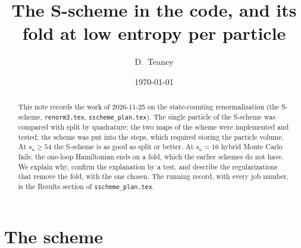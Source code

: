 \documentclass[11pt,aps,preprint,nofootinbib,superscriptaddress,tightenlines]{revtex4-2}
\begin{document}
\sloppy

\title{The S-scheme in the code, and its fold at low entropy per particle}
\author{D.~Teaney}
\date{\today}

\begin{abstract}
This note records the work of 2026-11-25 on the state-counting renormalization (the S-scheme, \nolinkurl{renorm3.tex}, \nolinkurl{sscheme_plan.tex}).
The single particle of the S-scheme was compared with split by quadrature; the two maps of the scheme were implemented and tested; the scheme was
put into the steps, which required storing the particle volume.  At $s_a\ge54$ the S-scheme is as good as split or better.  At $s_a=16$ hybrid
Monte Carlo fails: the one-loop Hamiltonian ends on a fold, which the earlier schemes do not have.  We explain why, confirm the explanation by a
test, and describe the regularizations that remove the fold, with the one chosen.  The running record, with every job number, is the Results
section of \nolinkurl{sscheme_plan.tex}.
\end{abstract}

\maketitle
\tableofcontents

\section{The scheme}
\label{sec:scheme}
\end{document}
